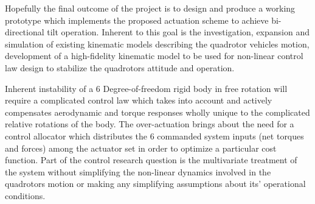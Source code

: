 \par
Hopefully the final outcome of the project is to design and produce a working prototype which implements the proposed actuation scheme to achieve bi-directional tilt operation. Inherent to this goal is the investigation, expansion and simulation of existing kinematic models describing the quadrotor vehicles motion, development of a high-fidelity kinematic model to be used for non-linear control law design to stabilize the quadrotors attitude and operation.   
\par
Inherent instability of a 6 Degree-of-freedom rigid body in free rotation will require a complicated control law which takes into account and actively compensates aerodynamic and torque responses wholly unique to the complicated relative rotations of the body. The over-actuation brings about the need for a control allocator which distributes the 6 commanded system inputs (net torques and forces) among the actuator set in order to optimize a particular cost function. Part of the control research question is the multivariate treatment of the system without simplifying the non-linear dynamics involved in the quadrotors motion or making any simplifying assumptions about its' operational conditions.
